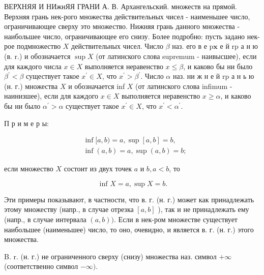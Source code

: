 \documentclass[10pt]{article}
\begin{document}
ВЕРХНЯЯ И НИжнЯЯ ГРАНИ А. В. Архангельский. множеств на прямой. Верхняя грань нек-рого множества действительных чисел - наименьшее число, ограничивающее сверху это множество. Нижняя грань данного множества - наибольшее число, ограничивающее его снизу. Более подробно: пусть задано нек-рое подмножество $X$ действительных чисел. Число $\beta$ наз. его в е $\mathrm{p} \mathbf{x}$ е й $\mathrm{r} \mathrm{p}$ а н ю (в. r.) и обозначается $\sup X$ (от латинского слова supremum - наивысшее), если для каждого числа $x \in X$ выполняется неравенство $x \leqslant \beta$, и каково бы ни было $\beta^{\prime}<\beta$ существует такое $x^{\prime} \in X$, что $x^{\prime}>\beta^{\prime}$. Число $\alpha$ наз. ни ж н е й $\mathrm{r} \mathrm{p}$ а н ь ю (н. г.) множества $X$ и обозначается inf $X$ (от латинского слова infimum - наинизшее), если для каждого $x \in X$ выполняется неравенство $x \geqslant \alpha$, и каково бы ни было $\alpha^{\prime}>\alpha$ существует такое $x^{\prime} \in X$, что $x^{\prime}<\alpha^{\prime}$.



П р и м е р ы:



\[

\begin{aligned}

& \inf [a, b)=a, \sup [a, b]=b, \\

& \inf (a, b)=a, \sup (a, b)=b ;

\end{aligned}

\]



если множество $X$ состоит из двух точек $a$ и $b, a<b$, то



\[

\text { inf } X=a, \sup X=b .

\]



Эти примеры показывают, в частности, что в. г. (н. г.) может как принадлежать этому множеству (напр., в случае отрезка $[a, b]$ ), так и не принадлежать ему (напр., в случае интервала $(a, b))$. Если в нек-ром множестве существует наибольшее (наименьшее) число, то оно, очевидно, и является в. г. (н. г.) этого множества.



B. r. (н. г.) не ограниченного сверху (снизу) множества наз. символ $+\infty$ (соответственно символ $-\infty)$.
\end{document}
